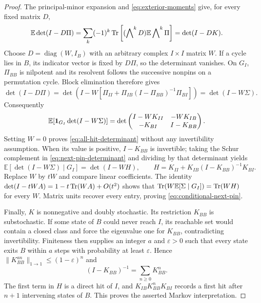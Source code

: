 \begin{proof}
The principal-minor expansion and \eqref{eq:exterior-moments} give,
for every fixed matrix $D$,
\begin{equation}\label{eq:determinant-expectation}
 \mathbb E\det(I-D\Pi)
  =\sum_k(-1)^k\operatorname{Tr}\left[(\bigwedge\nolimits^kD)
                           \mathbb E\bigwedge\nolimits^k\Pi\right]
  =\det(I-DK).
\end{equation}
Choose $D=\operatorname{diag}(W,I_B)$ with an arbitrary complex
$I\times I$ matrix $W$.  If a cycle lies in $B$, its indicator
vector is fixed by $D\Pi$, so the determinant vanishes.  On $G_I$,
$\Pi_{BB}$ is nilpotent and its resolvent follows the successive
nonpins on a permutation cycle.  Block elimination therefore gives
\[
 \det(I-D\Pi)
 =\det\left(I-W[\Pi_{II}+
               \Pi_{IB}(I-\Pi_{BB})^{-1}\Pi_{BI}]\right)
 =\det(I-W\Sigma).
\]
Consequently
\begin{equation}\label{eq:next-pin-determinant}
 \mathbb E[\mathbf1_{G_I}\det(I-W\Sigma)]
     =\det\begin{pmatrix}
             I-WK_{II}&-WK_{IB}\\
             -K_{BI}&I-K_{BB}
           \end{pmatrix}.
\end{equation}
Setting $W=0$ proves \eqref{eq:all-hit-determinant} without any
invertibility assumption.  When its value is positive,
$I-K_{BB}$ is invertible; taking the Schur complement in
\eqref{eq:next-pin-determinant} and dividing by that determinant yields
\[
 \mathbb E[\det(I-W\Sigma)\mid G_I]=\det(I-WH),
 \qquad H=K_{II}+K_{IB}(I-K_{BB})^{-1}K_{BI}.
\]
Replace $W$ by $tW$ and compare linear coefficients.  The identity
$\det(I-tWA)=1-t\operatorname{Tr}(WA)+O(t^2)$ shows that
$\operatorname{Tr}(W\mathbb E[\Sigma\mid G_I])=\operatorname{Tr}(WH)$ for every $W$.
Matrix units recover every entry, proving
\eqref{eq:conditional-next-pin}.

Finally, $K$ is nonnegative and doubly stochastic.  Its restriction
$K_{BB}$ is substochastic.  If some state of $B$ could never reach
$I$, its reachable set would contain a closed class and force the
eigenvalue one for $K_{BB}$, contradicting invertibility.  Finiteness
then supplies an integer $a$ and $\varepsilon>0$ such that every
state exits $B$ within $a$ steps with probability at least
$\varepsilon$.  Hence $\|K_{BB}^{an}\|_{1\to1}\le(1-\varepsilon)^n$
and
\[
                       (I-K_{BB})^{-1}=\sum_{n\ge0}K_{BB}^n.
\]
The first term in $H$ is a direct hit of $I$, and
$K_{IB}K_{BB}^nK_{BI}$ records a first hit after $n+1$ intervening
states of $B$.  This proves the asserted Markov interpretation.
\end{proof}

